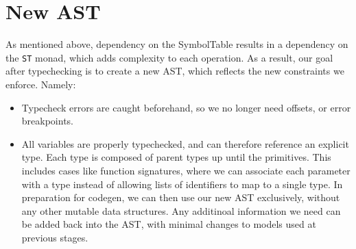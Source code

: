 \documentclass[11pt]{article}
\begin{document}
\section{New AST}
\label{sec:org3c20e48}
As mentioned above, dependency on the SymbolTable results in a
dependency on the \texttt{ST} monad, which adds complexity to each
operation.  As a result, our goal after typechecking is to create a
new AST, which reflects the new constraints we enforce.  Namely:
\begin{itemize}
\item Typecheck errors are caught beforehand, so we no longer need offsets,
or error breakpoints.
\item All variables are properly typechecked, and can therefore reference an
explicit type. Each type is composed of parent types up until the
primitives.  This includes cases like function signatures, where
we can associate each parameter with a type instead of allowing
lists of identifiers to map to a single type.  In preparation for
codegen, we can then use our new AST exclusively, without any
other mutable data structures. Any additinoal information we need
can be added back into the AST, with minimal changes to models
used at previous stages.
\end{itemize}
\end{document}
